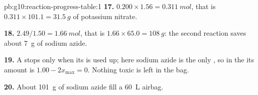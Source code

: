 \begin{solution}{pb:g10:reaction-progress-table:1}
\textbf{17.} $0.200 \times 1.56 = \qty{0.311}{mol}$, that is
$0.311 \times 101.1 = \qty{31.5}{g}$ of potassium nitrate.

\textbf{18.} $2.49 / 1.50 = \qty{1.66}{mol}$, that is
$1.66 \times 65.0 = \qty{108}{g}$: the second reaction saves about
\qty{7}{g} of sodium azide.

\textbf{19.} A  stops only when its  is
used up; here sodium azide is the only , so in the 
its amount is $1.00 - 2x_{\max} = 0$. Nothing toxic is left in the bag.

\textbf{20.} About \qty{101}{g} of sodium azide fill a \qty{60}{L}
airbag.
\end{solution}
